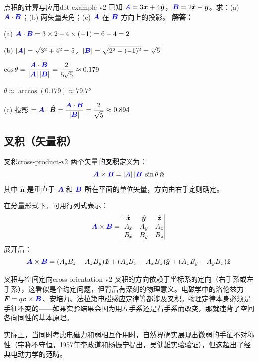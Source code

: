 \documentclass[11pt,a4paper,openany,oneside]{book}
\newcommand{\vecB}{\textcolor{blue}{\vect{B}}}
\newcommand{\vecA}{\textcolor{blue!70!black}{\vect{A}}}
\newcommand{\vect}[1]{\bm{#1}}
\newcommand{\unitvec}[1]{\hat{\vect{#1}}}
\newcommand{\difficulty}[1]{\marginnote{\textcolor{red}{\textbf{[#1]}}}}
\begin{document}
\begin{example}{点积的计算与应用}{dot-example-v2}
\difficulty{基础}
已知 $\vecA = 3\unitvec{x} + 4\unitvec{y}$，$\vecB = 2\unitvec{x} - \unitvec{y}$。求：(a) $\vecA \cdot \vecB$；(b) 两矢量夹角；(c) $\vecA$ 在 $\vecB$ 方向上的投影。
\tcblower
\textbf{解答：}

(a) $\vecA \cdot \vecB = 3 \times 2 + 4 \times (-1) = 6 - 4 = 2$

(b) $|\vecA| = \sqrt{3^2+4^2} = 5$，$|\vecB| = \sqrt{2^2+(-1)^2} = \sqrt{5}$

$\cos\theta = \dfrac{\vecA \cdot \vecB}{|\vecA|\,|\vecB|} = \dfrac{2}{5\sqrt{5}} \approx 0.179$

$\theta \approx \arccos(0.179) \approx 79.7°$

(c) 投影 $= \vecA \cdot \unitvec{B} = \dfrac{\vecA \cdot \vecB}{|\vecB|} = \dfrac{2}{\sqrt{5}} \approx 0.894$
\end{example}

\subsection{叉积（矢量积）}

\begin{definition}{叉积}{cross-product-v2}
两个矢量的\textbf{叉积}定义为：
\[
\vecA \times \vecB = |\vecA| \, |\vecB| \sin\theta \, \unitvec{n}
\]
其中 $\unitvec{n}$ 是垂直于 $\vecA$ 和 $\vecB$ 所在平面的单位矢量，方向由右手定则确定。

在分量形式下，可用行列式表示：
\[
\vecA \times \vecB = \begin{vmatrix}
\unitvec{x} & \unitvec{y} & \unitvec{z} \\
A_x & A_y & A_z \\
B_x & B_y & B_z
\end{vmatrix}
\]
展开后：
\[
\vecA \times \vecB = (A_y B_z - A_z B_y)\unitvec{x} + (A_z B_x - A_x B_z)\unitvec{y} + (A_x B_y - A_y B_x)\unitvec{z}
\]
\end{definition}

\begin{insight}{叉积与空间定向}{cross-orientation-v2}
叉积的方向依赖于坐标系的定向（右手系或左手系），这看似是个约定问题，但背后有深刻的物理意义。电磁学中的洛伦兹力 $\vect{F} = q\vect{v} \times \vecB$、安培力、法拉第电磁感应定律等都涉及叉积。物理定律本身必须是手征不变的——如果实验结果会因为用左手系还是右手系而改变，那就违背了空间各向同性的基本原理。

实际上，当同时考虑电磁力和弱相互作用时，自然界确实展现出微弱的手征不对称性（宇称不守恒，1957年李政道和杨振宁提出，吴健雄实验验证），但这超出了经典电动力学的范畴。
\end{insight}
\end{document}
